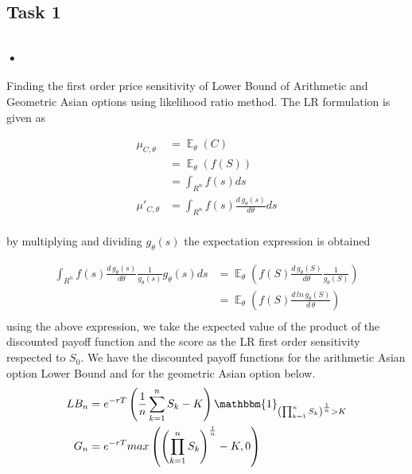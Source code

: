 \documentclass[10pt,oneside,a4paper]{article}
\DeclareMathOperator{\E}{\mathbb{E}}
\begin{document}
\begin{flushleft}


\section{Task 1}
\subsection{}
\subsubsection{•}
Finding the first order price sensitivity of Lower Bound of Arithmetic and Geometric Asian options using likelihood ratio method. The LR formulation is given as

\begin{align*}
\mu_{C, \theta} &= \E_\theta \left(C\right) \\
& = \E_\theta\left(f \left(S\right)\right) \\
& = \int_{R^n}^{} f \left(s\right) ds\\
\mu'_{C, \theta}&= \int_{R^n}^{} f \left(s\right)\frac{d \, g_\theta\left(s\right)}{d\theta}ds\\
\end{align*}

by multiplying and dividing $g_\theta\left(s\right)$ the expectation expression is obtained

\begin{align*}
\int_{R^n}^{} f \left(s\right)\frac{d \, g_\theta\left(s\right)}{d \theta} \frac{1}{g_\theta\left(s\right) }g_\theta\left(s\right) ds &= \E_\theta \left(f\left(S\right)\frac{d \, g_\theta\left(S\right)}{d \theta} \frac{1}{g_\theta\left(S\right) }\right)\\
&= \E_\theta \left(f\left(S\right)\frac{d \,ln \, g_\theta \left(S\right)}{d \, \theta}\right)\\
\end{align*}
using the above expression, we take the expected value of the product of the discounted payoff function and the score as the LR first order sensitivity respected to $S_0$. We have the discounted payoff functions for the arithmetic Asian option Lower Bound  and for the geometric Asian option below.
\begin{align*}
LB_n &= e^{-rT}\left( \frac{1}{n}\sum_{k=1}^{n}S_k - K\right) \mathbbm{1}_{\left( \prod_{k=1}^{n}S_k\right) ^{\frac{1}{n}} >K}\\
G_n &= e^{-rT} max \left(\left(\prod_{k=1}^{n}S_k\right) ^{\frac{1}{n}} - K, 0 \right)\\
\end{align*}


\end{flushleft}
\end{document}
